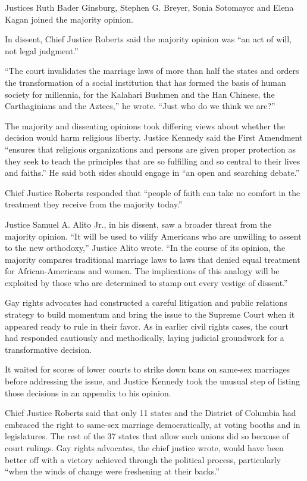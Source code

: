 Justices Ruth Bader Ginsburg, Stephen G. Breyer, Sonia Sotomayor and
Elena Kagan joined the majority opinion.

In dissent, Chief Justice Roberts said the majority opinion was ``an act
of will, not legal judgment.''

``The court invalidates the marriage laws of more than half the states
and orders the transformation of a social institution that has formed
the basis of human society for millennia, for the Kalahari Bushmen and
the Han Chinese, the Carthaginians and the Aztecs,'' he wrote. ``Just
who do we think we are?''

The majority and dissenting opinions took differing views about whether
the decision would harm religious liberty. Justice Kennedy said the
First Amendment ``ensures that religious organizations and persons are
given proper protection as they seek to teach the principles that are so
fulfilling and so central to their lives and faiths.'' He said both
sides should engage in ``an open and searching debate.''

Chief Justice Roberts responded that ``people of faith can take no
comfort in the treatment they receive from the majority today.''

Justice Samuel A. Alito Jr., in his dissent, saw a broader threat from
the majority opinion. ``It will be used to vilify Americans who are
unwilling to assent to the new orthodoxy,'' Justice Alito wrote. ``In
the course of its opinion, the majority compares traditional marriage
laws to laws that denied equal treatment for African-Americans and
women. The implications of this analogy will be exploited by those who
are determined to stamp out every vestige of dissent.''

Gay rights advocates had constructed a careful litigation and public
relations strategy to build momentum and bring the issue to the Supreme
Court when it appeared ready to rule in their favor. As in earlier civil
rights cases, the court had responded cautiously and methodically,
laying judicial groundwork for a transformative decision.

It waited for scores of lower courts to strike down bans on same-sex
marriages before addressing the issue, and Justice Kennedy took the
unusual step of listing those decisions in an appendix to his opinion.

Chief Justice Roberts said that only 11 states and the District of
Columbia had embraced the right to same-sex marriage democratically, at
voting booths and in legislatures. The rest of the 37 states that allow
such unions did so because of court rulings. Gay rights advocates, the
chief justice wrote, would have been better off with a victory achieved
through the political process, particularly ``when the winds of change
were freshening at their backs.''

